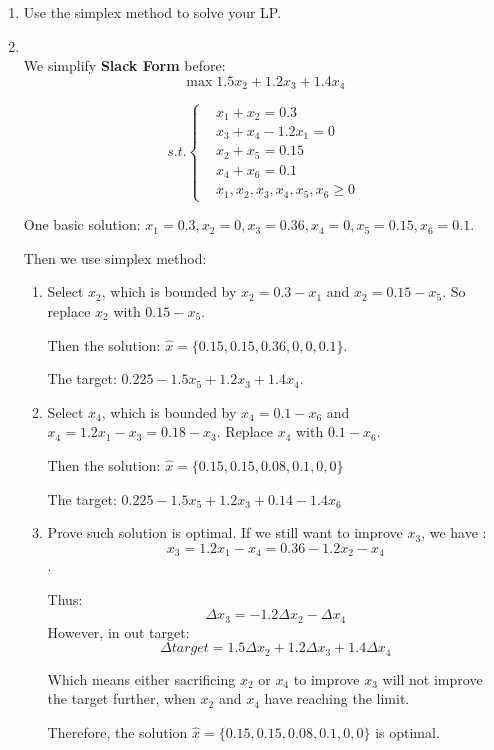 \documentclass[12pt,a4paper]{article}
\makeatletter
\newtheorem*{solution}{Solution}
\theoremstyle{definition}
\renewenvironment{solution}[1][Solution] {\par\pushQED{\qed}\normalfont\topsep6\p@\@plus6\p@\relax\trivlist\item[\hskip\labelsep\bfseries#1\@addpunct{.}]\ignorespaces}{\popQED\endtrivlist\@endpefalse} \makeatother
\makeatother
\begin{document}
\begin{enumerate}
\begin{enumerate}
    
    \item
    Use the simplex method to solve your LP.
    \begin{solution}
    ~\\
    We simplify \textbf{Slack Form} before:
    $$
    \max 1.5x_2 + 1.2x_3 + 1.4x_4
    $$
    
    $$
    s.t.\left\{
    \begin{aligned}
    &x_1 + x_2 = 0.3\\
    &x_3 + x_4 - 1.2x_1 =  0\\
    &x_2 +x_5 =  0.15\\
    &x_4 +x_{6}=  0.1\\
    &x_1,x_2,x_3,x_4,x_5,x_{6}\geq 0
    \end{aligned}
    \right.
    $$
    
    One basic solution: $x_1=0.3,x_2=0,x_3=0.36,x_4=0,x_5=0.15,x_6=0.1$.
    
    Then we use simplex method:
    \begin{enumerate}
        \item Select $x_2$, which is bounded by $x_2=0.3-x_1$ and $x_2 = 0.15 - x_5$. So replace $x_2$ with $0.15-x_5$. 
        
        Then the solution: $\hat{x}=\{0.15,0.15,0.36,0,0,0.1\}$.
        
        The target: $ 0.225-1.5x_5 + 1.2x_3 + 1.4x_4$.
        \item Select $x_4$, which is bounded by $x_4 = 0.1 - x_6$ and $x_4 = 1.2x_1-x_3=0.18-x_3$. Replace $x_4$ with $0.1-x_6$. 
        
        Then the solution: $\hat{x}=\{0.15,0.15,0.08,0.1,0,0\}$
        
        The target: $0.225-1.5x_5 + 1.2x_3 + 0.14- 1.4x_6$
        \item Prove such solution is optimal. If we still want to improve $x_3$, we have :
        $$x_3=1.2x_1-x_4=0.36-1.2x_2-x_4$$.
        
        Thus:
        $$\Delta x_3 = -1.2\Delta x_2 - \Delta x_4$$
        However, in out target: 
        $$
        \Delta target = 1.5\Delta x_2 + 1.2\Delta x_3 + 1.4\Delta x_4
        $$
        
        Which means either sacrificing $x_2$ or $x_4$ to improve $x_3$ will not improve the target further, when $x_2$ and $x_4$ have reaching the limit.
        
        Therefore, the solution $\hat{x}=\{0.15,0.15,0.08,0.1,0,0\}$ is optimal.
        

\end{enumerate}
\end{solution}
\end{enumerate}
\end{enumerate}
\end{document}

